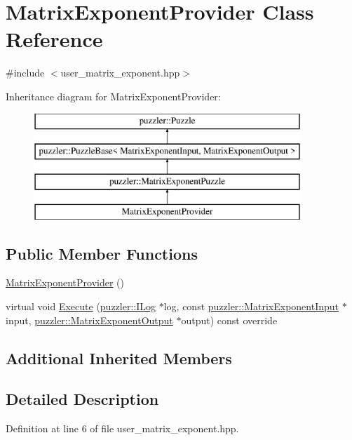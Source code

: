 \hypertarget{a00017}{}\section{Matrix\+Exponent\+Provider Class Reference}
\label{a00017}


{\ttfamily \#include $<$user\+\_\+matrix\+\_\+exponent.\+hpp$>$}

Inheritance diagram for Matrix\+Exponent\+Provider\+:\begin{figure}[H]
\begin{center}
\leavevmode
\includegraphics[height=4.000000cm]{a00017}
\end{center}
\end{figure}
\subsection*{Public Member Functions}
\begin{DoxyCompactItemize}
\item 
\hyperlink{a00017_a152acb14c931d9055c6298080ed462c3}{Matrix\+Exponent\+Provider} ()
\item 
virtual void \hyperlink{a00017_ad4b5e5fb6d42a2afa2e5a85a1660dce4}{Execute} (\hyperlink{a00008}{puzzler\+::\+I\+Log} $\ast$log, const \hyperlink{a00015}{puzzler\+::\+Matrix\+Exponent\+Input} $\ast$input, \hyperlink{a00016}{puzzler\+::\+Matrix\+Exponent\+Output} $\ast$output) const override
\end{DoxyCompactItemize}
\subsection*{Additional Inherited Members}


\subsection{Detailed Description}


Definition at line 6 of file user\+\_\+matrix\+\_\+exponent.\+hpp.



